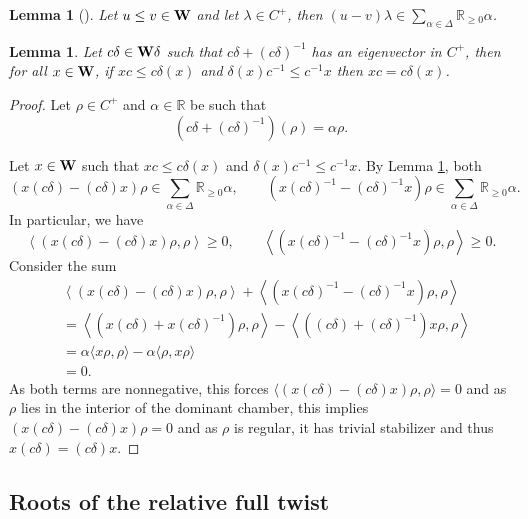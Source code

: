 \documentclass[article, 10pt, oneside, reqno]{amsart}
\theoremstyle{plain}
\newtheorem{lem}[thm]{Lemma}
\theoremstyle{definition}
\theoremstyle{remark}
\newcommand{\Rbb}{\mathbb{R}}
\begin{document}
\begin{lem}[]\label{lem:positivityDifference}
Let $u \leq v \in \mathbf{W}$ and let $\lambda \in C^+$, then $(u - v)\lambda \in \sum_{\alpha \in \Delta} \Rbb_{\geq 0}\alpha$.
\end{lem} 

\begin{lem}\label{lem:good-root-of-ft-selects-centralizer}
Let $c\delta \in \mathbf{W}\delta$ such that $c\delta + (c\delta)^{-1}$ has an eigenvector in $C^+$, then for all $x \in \mathbf{W}$, if $xc \leq c\delta(x)$ and $\delta(x)c^{-1} \leq c^{-1}x$ then $xc = c\delta(x)$. 
\end{lem}

\begin{proof}
 Let $\rho \in C^+$ and $\alpha \in \Rbb$ be such that 
$$(c\delta + (c\delta)^{-1})(\rho) = \alpha\rho.$$

Let $x \in \mathbf{W}$ such that $xc \leq c\delta(x)$ and $\delta(x)c^{-1} \leq c^{-1}x$. By Lemma \ref{lem:positivityDifference}, both 
$$(x(c\delta) - (c\delta)x)\rho \in \sum_{\alpha \in \Delta} \Rbb_{\geq 0}\alpha, \qquad (x(c\delta)^{-1} - (c\delta)^{-1}x)\rho \in \sum_{\alpha \in \Delta} \Rbb_{\geq 0}\alpha.$$
In particular, we have 
$$\left\langle (x(c\delta) - (c\delta)x)\rho, \rho \right\rangle \geq 0, \qquad \left\langle (x(c\delta)^{-1} - (c\delta)^{-1}x)\rho, \rho \right\rangle \geq 0.$$
Consider the sum 
\begin{align*}
&\left\langle (x(c\delta) - (c\delta)x)\rho, \rho \right\rangle + \left\langle (x(c\delta)^{-1} - (c\delta)^{-1}x)\rho, \rho \right\rangle  \\ 
&= \left\langle (x(c\delta) + x(c\delta)^{-1})\rho, \rho \right\rangle - \left\langle ((c\delta) + (c\delta)^{-1})x\rho, \rho \right\rangle \\
&= \alpha\langle x\rho, \rho\rangle - \alpha\langle \rho, x\rho \rangle \\
&= 0.
\end{align*}
As both terms are nonnegative, this forces $\langle (x(c\delta) - (c\delta)x)\rho, \rho \rangle = 0$ and as $\rho$ lies in the interior of the dominant chamber, this implies $(x(c\delta) - (c\delta)x)\rho = 0$ and as $\rho$ is regular, it has trivial stabilizer and thus $x(c\delta) = (c\delta)x$.
\end{proof}

\subsection{Roots of the relative full twist}
\end{document}
